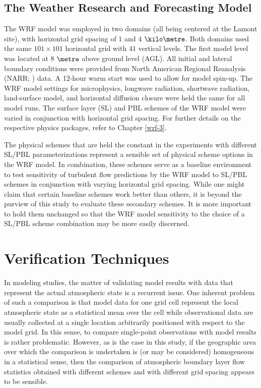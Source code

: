 \subsection{The Weather Research and Forecasting Model}
\label{wrf-412}

The WRF model was employed in two domains (all being centered at the Lamont site), with horizontal grid spacing of $1$ and $4$ $\kilo\metre$. Both domains used the same $101\times101$ horizontal grid with $41$ vertical levels. The first model level was located at 8 $\metre$ above ground level (AGL). All initial and lateral boundary conditions were provided from North American Regional Reanalysis (NARR; \citealt{NARR}) data. A 12-hour warm start was used to allow for model spin-up. The WRF model settings for microphysics, longwave radiation, shortwave radiation, land-surface model, and horizontal diffusion closure were held the same for all model runs. The surface layer (SL) and PBL schemes of the WRF model were varied in conjunction with horizontal grid spacing. For further details on the respective physics packages, refer to Chapter \autoref{wrf-3}.

The physical schemes that are held the constant in the experiments with different SL\slash PBL parameterizations represent a sensible set of physical scheme options in the WRF model. In combination, these schemes serve as a baseline environment to test sensitivity of turbulent flow predictions by the WRF model to SL\slash PBL schemes in conjunction with varying horizontal grid spacing. While one might claim that certain baseline schemes work better than others, it is beyond the purview of this study to evaluate these secondary schemes. It is more important to hold them unchanged so that the WRF model sensitivity to the choice of a SL\slash PBL scheme combination may be more easily discerned.

\section{Verification Techniques}
\label{vt-42}

In modeling studies, the matter of validating model results with data that represent the actual atmospheric state is a recurrent issue. One inherent problem of such a comparison is that model data for one grid cell represent the local atmospheric state as a statistical mean over the cell while observational data are usually collected at a single location arbitrarily positioned with respect to the model grid. In this sense, to compare single-point observations with model results is rather problematic. However, as is the case in this study, if the geographic area over which the comparison is undertaken is (or may be considered) homogeneous in a statistical sense, then the comparison of atmospheric boundary layer flow statistics obtained with different schemes and with different grid spacing appears to be sensible.

